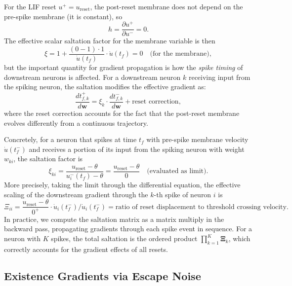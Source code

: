\documentclass[10pt,twocolumn]{article}
\begin{document}
For the LIF reset $u^+ = u_{\text{reset}}$, the post-reset membrane does not depend on the pre-spike membrane (it is constant), so
\begin{equation}
    h = \frac{\partial u^+}{\partial u^-} = 0.
\end{equation}
The effective scalar saltation factor for the membrane variable is then
\begin{equation}
    \xi = 1 + \frac{(0 - 1) \cdot 1}{\dot{u}(t_f)} \cdot \dot{u}(t_f) = 0 \quad \text{(for the membrane)},
\end{equation}
but the important quantity for gradient propagation is how the \emph{spike timing} of downstream neurons is affected. For a downstream neuron $k$ receiving input from the spiking neuron, the saltation modifies the effective gradient as:
\begin{equation}
    \frac{dt_{f,k}^+}{d\mathbf{w}} = \xi_k \cdot \frac{dt_{f,k}^-}{d\mathbf{w}} + \text{reset correction},
\end{equation}
where the reset correction accounts for the fact that the post-reset membrane evolves differently from a continuous trajectory.

Concretely, for a neuron that spikes at time $t_f$ with pre-spike membrane velocity $\dot{u}(t_f^-)$ and receives a portion of its input from the spiking neuron with weight $w_{ki}$, the saltation factor is
\begin{equation}
    \xi_{ki} = \frac{u_{\text{reset}} - \theta}{u^-_i(t_f) - \theta} = \frac{u_{\text{reset}} - \theta}{0} \quad \text{(evaluated as limit)}.
\end{equation}
More precisely, taking the limit through the differential equation, the effective scaling of the downstream gradient through the $k$-th spike of neuron $i$ is
\begin{equation}
    \Xi_{ii} = \frac{u_{\text{reset}} - \theta}{0^+} \cdot \dot{u}_i(t_f^-) \big/ \dot{u}_i(t_f^-) = \text{ratio of reset displacement to threshold crossing velocity}.
\end{equation}
In practice, we compute the saltation matrix as a matrix multiply in the backward pass, propagating gradients through each spike event in sequence. For a neuron with $K$ spikes, the total saltation is the ordered product $\prod_{k=1}^{K} \mathbf{\Xi}_k$, which correctly accounts for the gradient effects of all resets.

\subsection{Existence Gradients via Escape Noise}
\end{document}
